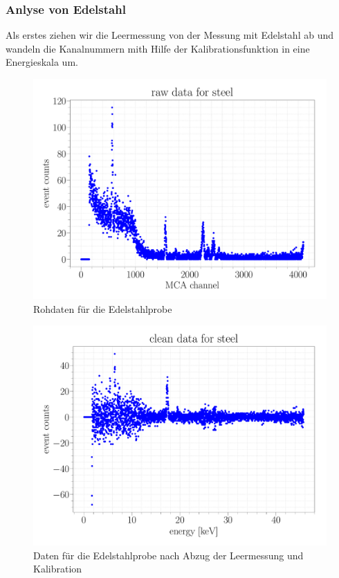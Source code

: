 \documentclass[a4paper,14pt]{article}
\begin{document}
\subsubsection{Anlyse von Edelstahl}
Als erstes ziehen wir die Leermessung von der Messung mit Edelstahl ab und wandeln die Kanalnummern mith Hilfe der Kalibrationsfunktion in eine Energieskala um.

\begin{figure}[H]
\centering
\includegraphics[scale=0.25]{../Figures/am_fe_raw.pdf}
\caption{Rohdaten für die Edelstahlprobe}
\label{am_fe_raw}
\end{figure}

\begin{figure}[H]
\centering
\includegraphics[scale=0.25]{../Figures/am_fe_clean.pdf}
\caption{Daten für die Edelstahlprobe nach Abzug der Leermessung und Kalibration}
\label{resolution}
\end{figure}
\end{document}
